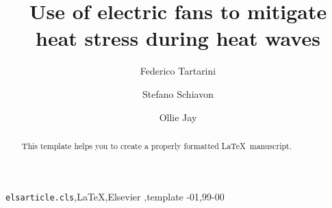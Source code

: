 
\begin{frontmatter}

\title{Use of electric fans to mitigate heat stress during heat waves}

\author[sinBerBest]{Federico Tartarini}
\author[CBE]{Stefano Schiavon}
\author[USYD]{Ollie Jay}

\address[sinBerBest]{SinBerBEST, Berkeley Education Alliance for Research in Singapore, Singapore}
\address[CBE]{Center for the Built Environment, University of California, Berkeley, USA}
\address[USYD]{Sydney School ofHealth Sciences, Faculty ofMedicine and Health, The University ofSydney, Sydney, Australia}

\begin{abstract}
This template helps you to create a properly formatted \LaTeX\ manuscript.
\end{abstract}

\begin{keyword}
\texttt{elsarticle.cls}\sep \LaTeX\sep Elsevier \sep template
-01\sep  99-00
\end{keyword}

\end{frontmatter}
